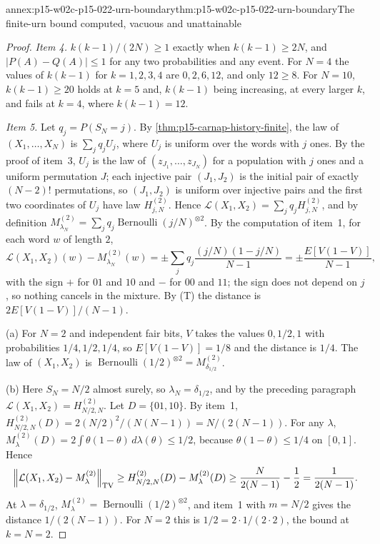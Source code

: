 \begin{annexitem}{annex:p15-w02c-p15-022-urn-boundary}{thm:p15-w02c-p15-022-urn-boundary}{The finite-urn bound computed, vacuous and unattainable}
\begin{proof}
\emph{Item 4.} \(k(k-1)/(2N)\geq1\) exactly when \(k(k-1)\geq2N\), and
\(|P(A)-Q(A)|\leq1\) for any two probabilities and any event. For
\(N=4\) the values of \(k(k-1)\) for \(k=1,2,3,4\) are \(0,2,6,12\),
and only \(12\geq8\). For \(N=10\), \(k(k-1)\geq20\) holds at \(k=5\)
and, \(k(k-1)\) being increasing, at every larger \(k\), and fails at
\(k=4\), where \(k(k-1)=12\).

\emph{Item 5.} Let \(q_j=P(S_N=j)\). By
\cref{thm:p15-carnap-history-finite}, the law of \((X_1,\ldots,X_N)\) is
\(\sum_jq_jU_j\), where \(U_j\) is uniform over the words with \(j\)
ones. By the proof of item~3, \(U_j\) is the law of
\((z_{J_1},\ldots,z_{J_N})\) for a population with \(j\) ones and a
uniform permutation \(J\); each injective pair \((J_1,J_2)\) is the
initial pair of exactly \((N-2)!\) permutations, so \((J_1,J_2)\) is
uniform over injective pairs and the first two coordinates of \(U_j\)
have law \(H_{j,N}^{(2)}\). Hence
\(\mathcal L(X_1,X_2)=\sum_jq_jH_{j,N}^{(2)}\), and by definition
\(M_{\lambda_N}^{(2)}=\sum_jq_j\operatorname{Bernoulli}(j/N)^{\otimes2}\).
By the computation of item~1, for each word \(w\) of length \(2\),
\[
 \mathcal L(X_1,X_2)(w)-M_{\lambda_N}^{(2)}(w)
 =\pm\sum_jq_j\frac{(j/N)(1-j/N)}{N-1}=\pm\frac{E[V(1-V)]}{N-1},
\]
with the sign \(+\) for \(01\) and \(10\) and \(-\) for \(00\) and \(11\);
the sign does not depend on \(j\), so nothing cancels in the mixture.
By (T) the distance is \(2E[V(1-V)]/(N-1)\).

(a) For \(N=2\) and independent fair bits, \(V\) takes the values
\(0,1/2,1\) with probabilities \(1/4,1/2,1/4\), so
\(E[V(1-V)]=1/8\) and the distance is \(1/4\). The law of
\((X_1,X_2)\) is \(\operatorname{Bernoulli}(1/2)^{\otimes2}=M_{\delta_{1/2}}^{(2)}\).

(b) Here \(S_N=N/2\) almost surely, so \(\lambda_N=\delta_{1/2}\), and by
the preceding paragraph \(\mathcal L(X_1,X_2)=H_{N/2,N}^{(2)}\). Let
\(D=\{01,10\}\). By item~1,
\(H_{N/2,N}^{(2)}(D)=2(N/2)^2/(N(N-1))=N/(2(N-1))\). For any \(\lambda\),
\(M_\lambda^{(2)}(D)=2\int\theta(1-\theta)\,d\lambda(\theta)\leq1/2\),
because \(\theta(1-\theta)\leq1/4\) on \([0,1]\). Hence
\[
 \left\|\mathcal L(X_1,X_2)-M_\lambda^{(2)}\right\|_{\rm TV}
 \geq H_{N/2,N}^{(2)}(D)-M_\lambda^{(2)}(D)
 \geq\frac N{2(N-1)}-\frac12=\frac1{2(N-1)}.
\]
At \(\lambda=\delta_{1/2}\), \(M_\lambda^{(2)}=\operatorname{Bernoulli}(1/2)^{\otimes2}\),
and item~1 with \(m=N/2\) gives the distance \(1/(2(N-1))\). For \(N=2\)
this is \(1/2=2\cdot1/(2\cdot2)\), the bound at \(k=N=2\).
\end{proof}
\end{annexitem}
